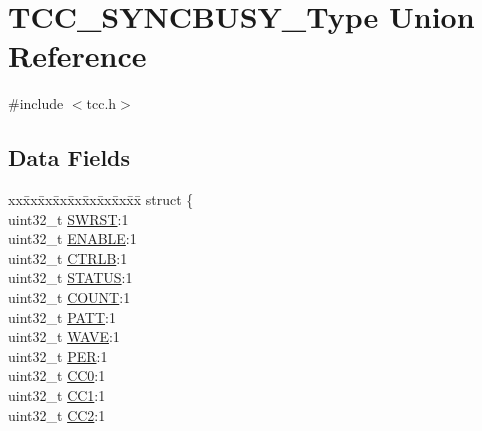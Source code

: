 \hypertarget{union_t_c_c___s_y_n_c_b_u_s_y___type}{}\section{T\+C\+C\+\_\+\+S\+Y\+N\+C\+B\+U\+S\+Y\+\_\+\+Type Union Reference}
\label{union_t_c_c___s_y_n_c_b_u_s_y___type}


{\ttfamily \#include $<$tcc.\+h$>$}

\subsection*{Data Fields}
\begin{DoxyCompactItemize}
\item 
\begin{tabbing}
xx\=xx\=xx\=xx\=xx\=xx\=xx\=xx\=xx\=\kill
struct \{\\
\>uint32\_t \mbox{\hyperlink{union_t_c_c___s_y_n_c_b_u_s_y___type_a34cd956a8da179cbd5fc9060306d420e}{SWRST}}:1\\
\>uint32\_t \mbox{\hyperlink{union_t_c_c___s_y_n_c_b_u_s_y___type_a66f979832c85e0692bd9422b05aff1f7}{ENABLE}}:1\\
\>uint32\_t \mbox{\hyperlink{union_t_c_c___s_y_n_c_b_u_s_y___type_a0ac0bbc2a904755b6f260b002320735a}{CTRLB}}:1\\
\>uint32\_t \mbox{\hyperlink{union_t_c_c___s_y_n_c_b_u_s_y___type_a3f9158fbf21c247984a9c169ebe43143}{STATUS}}:1\\
\>uint32\_t \mbox{\hyperlink{union_t_c_c___s_y_n_c_b_u_s_y___type_aa9f8906e3d27dfbf12691127c9bb88ba}{COUNT}}:1\\
\>uint32\_t \mbox{\hyperlink{union_t_c_c___s_y_n_c_b_u_s_y___type_a2749f1187bb4ab83ce0b61e2e6781684}{PATT}}:1\\
\>uint32\_t \mbox{\hyperlink{union_t_c_c___s_y_n_c_b_u_s_y___type_af8b296eb513c277beb5dd7f7cfa18d1b}{WAVE}}:1\\
\>uint32\_t \mbox{\hyperlink{union_t_c_c___s_y_n_c_b_u_s_y___type_a3a85cb8e507302b97a36eaf1c13d0b72}{PER}}:1\\
\>uint32\_t \mbox{\hyperlink{union_t_c_c___s_y_n_c_b_u_s_y___type_a2e02ab127c4084288f85d9e18dcc4153}{CC0}}:1\\
\>uint32\_t \mbox{\hyperlink{union_t_c_c___s_y_n_c_b_u_s_y___type_aec8af9fb0b1b5cde42035e59e25cca6e}{CC1}}:1\\
\>uint32\_t \mbox{\hyperlink{union_t_c_c___s_y_n_c_b_u_s_y___type_adca84aef985de69d035a0c5bff2a5003}{CC2}}:1\\

\end{tabbing}
\end{DoxyCompactItemize}
